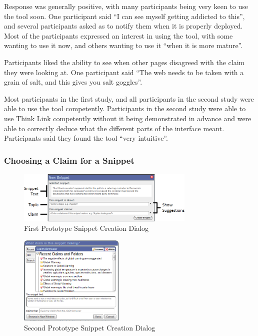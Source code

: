 \documentclass{chi2009}
\begin{document}
Response was generally positive, with many participants being very keen to use the tool soon. One participant said ``I can see myself getting addicted to this'', and several participants asked as to notify them when it is properly deployed. Most of the participants expressed an interest in using the tool, with some wanting to use it now, and others wanting to use it ``when it is more mature''.

Participants liked the ability to see when other pages disagreed with the claim they were looking at. One participant said ``The web needs to be taken with a grain of salt, and this gives you salt goggles''.

Most participants in the first study, and all participants in the second study were able to use the tool competently. Participants in the second study were able to use Think Link competently without it being demonstrated in advance and were able to correctly deduce what the different parts of the interface meant. Participants said they found the tool ``very intuitive''.

\subsubsection{Choosing a Claim for a Snippet}

\begin{figure}[t]
	\includegraphics[width=8.5cm]{../screenshots/oldsnipcreate_diagram.png}
	\caption{First Prototype Snippet Creation Dialog}
	\label{oldsnippetbox}
\end{figure}

\begin{figure}[t]
\begin{center}
	\includegraphics[width=5cm]{../screenshots/newsnip_browseopen.png}
	\caption{Second Prototype Snippet Creation Dialog}
	\label{secondsnippetbox}
\end{center}
\end{figure}
\end{document}
